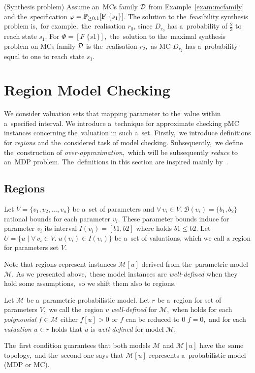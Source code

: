 \begin{example} (Synthesis problem)
Assume an~MCs family $\mathcal{D}$ from Example~\ref{exam:mcfamily} and the~specification $\varphi = \mathbb{P}_{\geq 0.1}[\mathrm{F}\ \{s_1\}]$.
The solution to the~feasibility synthesis problem is,~for example,~the~realisation $r_0$, since $D_{r_0}$ has a~probability of $\frac{2}{3}$ to reach state $s_1$.
For $\varPhi = [F \; \{s1\}]$,~the~solution to the~maximal synthesis problem on MCs family $\mathcal{D}$ is the~realisation $r_2$,~as MC $D_{r_2}$ has a~probability equal to one to reach state $s_1$.
\end{example}

\section{Region Model Checking}
We consider valuation sets that mapping parameter to the~value within a~specified interval. 
We introduce a~technique for approximate checking pMC instances concerning the~valuation in such a~set.
Firstly,~we introduce definitions for \textit{regions} and the~considered task of model checking.
Subsequently,~we define the~construction of \textit{over-approximation},~which will be subsequently \textit{reduce} to an~MDP problem.
The~definitions in this section are inspired mainly by~\cite{Quatmann2016}.

\subsection{Regions}
\begin{definition}[Region]
Let $V = \{ v_1, v_2, \dots, v_n \}$ be a~set of parameters and $\forall \, v_i \in V. \; \mathcal{B}(v_i) = \{b_1, b_2 \}$ rational bounds for each parameter $v_i$.
These parameter bounds induce for parameter $v_i$ its interval $I(v_i) = [b1, b2]$ where holds $b1 \leq b2$.
Let $U = \{ u \; \lvert \; \forall \, v_i \in V. \; u(v_i) \in I(v_i) \}$ be a~set of valuations, which we call a region for parameters set $V$.
\end{definition}
\noindent
Note that regions represent instances $\mathcal{M}[u]$ derived from the~parametric model $\mathcal{M}$.
As we presented above,~these model instances are \textit{well-defined} when they hold some assumptions,~so we shift them also to regions.

\begin{definition}
Let $\mathcal{M}$ be a~parametric probabilistic model.
Let $r$ be a~region for set of parameters $V$,~we call the~region $v$ \textit{well-defined} for $\mathcal{M}$,~when holds for each \textit{polynomial} $f \in \mathcal{M}$ either $f[u] > 0$ or  $f$ can be reduced to 0 $f = 0$,~and for each \textit{valuation} $u \in r$ holds that $u$ is \textit{well-defined} for model $\mathcal{M}$.
\end{definition}
\noindent
The~first condition guarantees that both models $\mathcal{M}$ and $\mathcal{M}[u]$ have the~same topology,~and the~second one says that $\mathcal{M}[u]$ represents a~probabilistic model (MDP or MC).

